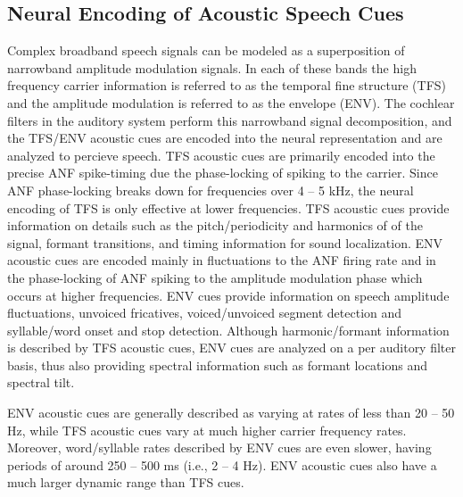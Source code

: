 \subsection{Neural Encoding of Acoustic Speech Cues} \label{section:encoding_acoustic_cues}


Complex broadband speech signals can be modeled as a superposition of narrowband amplitude modulation signals. In each of these bands the high frequency carrier information is referred to as the temporal fine structure (TFS) and the amplitude modulation is referred to as the envelope (ENV). The cochlear filters in the auditory system perform this narrowband signal decomposition, and the TFS/ENV acoustic cues are encoded into the neural representation and are analyzed to percieve speech. TFS acoustic cues are primarily encoded into the precise ANF spike-timing due the phase-locking of spiking to the carrier. Since ANF phase-locking breaks down for frequencies over 4 -- 5 \unit{\kilo\hertz}, the neural encoding of TFS is only effective at lower frequencies. TFS acoustic cues provide information on details such as the pitch/periodicity and harmonics of of the signal, formant transitions, and timing information for sound localization. ENV acoustic cues are encoded mainly in fluctuations to the ANF firing rate and in the phase-locking of ANF spiking to the amplitude modulation phase which occurs at higher frequencies. ENV cues provide information on speech amplitude fluctuations, unvoiced fricatives, voiced/unvoiced segment detection and syllable/word onset and stop detection. Although harmonic/formant information is described by TFS acoustic cues, ENV cues are analyzed on a per auditory filter basis, thus also providing spectral information such as formant locations and spectral tilt.

ENV acoustic cues are generally described as varying at rates of less than 20 -- 50 \unit{Hz}, while TFS acoustic cues vary at much higher carrier frequency rates. Moreover, word/syllable rates described by ENV cues are even slower, having periods of around 250 -- 500 \unit{\milli\second} (i.e., 2 -- 4 \unit{\hertz}). ENV acoustic cues also have a much larger dynamic range than TFS cues.

